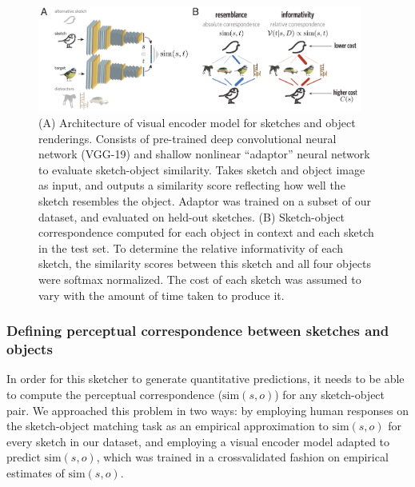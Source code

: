 \documentclass[9pt,twocolumn,twoside]{pnas-new}
\begin{document}
\begin{figure}[htbp]
\centering
\includegraphics[width=0.95\textwidth]{figures/4_model_schematic.pdf}
\caption{(A) Architecture of visual encoder model for sketches and object renderings. Consists of pre-trained deep convolutional neural network (VGG-19) and shallow nonlinear ``adaptor'' neural network to evaluate sketch-object similarity. Takes sketch and object image as input, and outputs a similarity score reflecting how well the sketch resembles the object. Adaptor was trained on a subset of our dataset, and evaluated on held-out sketches. (B) Sketch-object correspondence computed for each object in context and each sketch in the test set. To determine the relative informativity of each sketch, the similarity scores between this sketch and all four objects were softmax normalized. The cost of each sketch was assumed to vary with the amount of time taken to produce it.}
\label{model_schematic}
\end{figure}


\subsubsection*{Defining perceptual correspondence between sketches and objects}

In order for this sketcher to generate quantitative predictions, it needs to be able to compute the perceptual correspondence ($\textrm{sim}(s,o)$) for any sketch-object pair. 
We approached this problem in two ways: by employing human responses on the sketch-object matching task as an empirical approximation to $\textrm{sim}(s,o)$ for every sketch in our dataset, and employing a visual encoder model adapted to predict $\textrm{sim}(s,o)$, which was trained in a crossvalidated fashion on empirical estimates of $\textrm{sim}(s,o)$.
\end{document}
